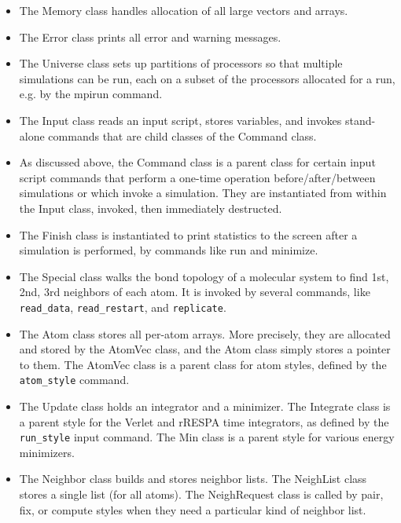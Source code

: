 \documentclass{article}
\newcommand{\code}[1]{{\color{cadetblue}\texttt{#1}}}
\begin{document}
\begin{itemize}

\item The Memory class handles allocation of all large vectors and
  arrays.

\item The Error class prints all error and warning messages.

\item The Universe class sets up partitions of processors so that
  multiple simulations can be run, each on a subset of the processors
  allocated for a run, e.g. by the mpirun command.

\item The Input class reads an input script, stores variables, and
  invokes stand-alone commands that are child classes of the Command
  class.

\item As discussed above, the Command class is a parent class for
  certain input script commands that perform a one-time operation
  before/after/between simulations or which invoke a simulation.  They
  are instantiated from within the Input class, invoked, then
  immediately destructed.

\item The Finish class is instantiated to print statistics to the
  screen after a simulation is performed, by commands like run and
  minimize.

\item The Special class walks the bond topology of a molecular system to find
  1st, 2nd, 3rd neighbors of each atom. It is invoked by several commands, like
  \code{read\_data}, \code{read\_restart}, and \code{replicate}.

\item The Atom class stores all per-atom arrays.  More precisely, they
  are allocated and stored by the AtomVec class, and the Atom class
  simply stores a pointer to them.  The AtomVec class is a parent
  class for atom styles, defined by the \code{atom\_style} command.

\item The Update class holds an integrator and a minimizer.  The
  Integrate class is a parent style for the Verlet and rRESPA time
  integrators, as defined by the \code{run\_style} input command.  The Min
  class is a parent style for various energy minimizers.

\item The Neighbor class builds and stores neighbor lists.  The
  NeighList class stores a single list (for all atoms).  The
  NeighRequest class is called by pair, fix, or compute styles when
  they need a particular kind of neighbor list.


\end{itemize}
\end{document}
